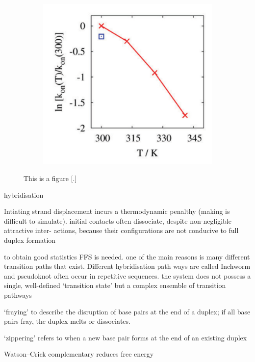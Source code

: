 \begin{figure}[ht]
\begin{centering}
\begin{subfigure}[t]{\dimexpr.2\linewidth-1.3em\relax}
  \includegraphics[width=1.5\linewidth,valign=t]{Figures/hybridDiag6.png}
  \end{subfigure}
  \caption{This is a figure [.]}
  \label{fig:test}
  \end{centering}

\end{figure}


hybridisation

Intiating strand displacement incurs a thermodynamic penalthy
(making is difficult to simulate). initial contacts often dissociate, despite
non-negligible attractive inter- actions, because their configurations are not conducive
to full duplex formation

to obtain good statistics FFS is needed. one of the main reasons is many different
transition paths that exist. Different hybridisation path ways are called Inchworm and
pseudoknot often occur in repetitive sequences. the system does not possess a single,
well-defined ‘transition state’ but a complex ensemble of transition pathways


‘fraying’ to describe the disruption of base pairs at the end of a duplex; if all base
pairs fray, the duplex melts or dissociates.

‘zippering’ refers to when a new base pair forms at the end of an existing duplex

Watson–Crick complementary reduces free energy

